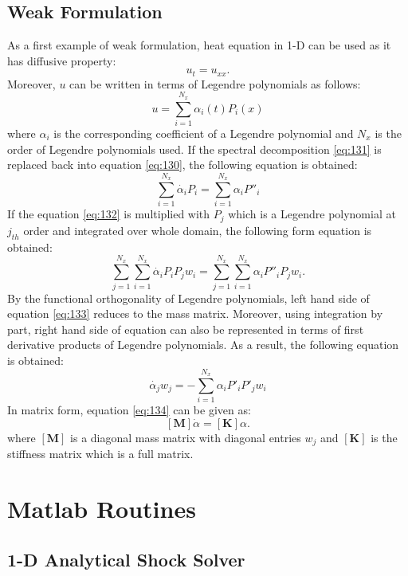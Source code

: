 \documentclass[12pt]{report}
\begin{document}
\section{Weak Formulation \label{Weak}}
As a first example of weak formulation, heat equation in 1-D can be used as it has diffusive property:
\begin{equation}
\label{eq:130}
u_t=u_{xx}.
\end{equation}
Moreover, $u$ can be written in terms of Legendre polynomials as follows:
\begin{equation}
\label{eq:131}
u=\sum_{i=1}^{N_x}\alpha_{i}(t) P_i(x)
\end{equation}
where $\alpha_i$ is the corresponding coefficient of a Legendre polynomial and $N_x$ is the order of Legendre polynomials used. If the spectral decomposition \ref{eq:131} is replaced back into equation \ref{eq:130}, the following equation is obtained:
\begin{equation}
\label{eq:132}
\sum_{i=1}^{N_x}\dot{\alpha_{i}} P_i=\sum_{i=1}^{N_x}\alpha_{i} {P}''_i
\end{equation}
If the equation \ref{eq:132} is multiplied with $P_j$ which is a Legendre polynomial at $j_{th}$ order and integrated over whole domain, the following form equation is obtained:
\begin{equation}
\label{eq:133}
\sum_{j=1}^{N_x}\sum_{i=1}^{N_x}\dot{\alpha_{i}} P_i P_j w_i =\sum_{j=1}^{N_x} \sum_{i=1}^{N_x}\alpha_{i} {P}''_i P_j w_i.
\end{equation}
By the functional orthogonality of Legendre polynomials, left hand side of equation \ref{eq:133} reduces to the mass matrix. Moreover, using integration by part, right hand side of equation can also be represented in terms of first derivative products of Legendre polynomials. As a result, the following equation is obtained:
\begin{equation}
\label{eq:134}
\dot{\alpha_{j}}  w_j=- \sum_{i=1}^{N_x}\alpha_{i} {P}'_i {P}'_j w_i
\end{equation}
In matrix form, equation \ref{eq:134} can be given as:
\begin{equation}
\label{eq:135}
[\mathbf{M}]\dot{\alpha}=[\mathbf{K}]\alpha.
\end{equation}
where $[\mathbf{M}]$ is a diagonal mass matrix with diagonal entries $w_j$ and $[\mathbf{K}]$ is the stiffness matrix which is a full matrix. 
\chapter{Matlab Routines}
\section{1-D Analytical Shock Solver}
 
 
 



\end{document}

